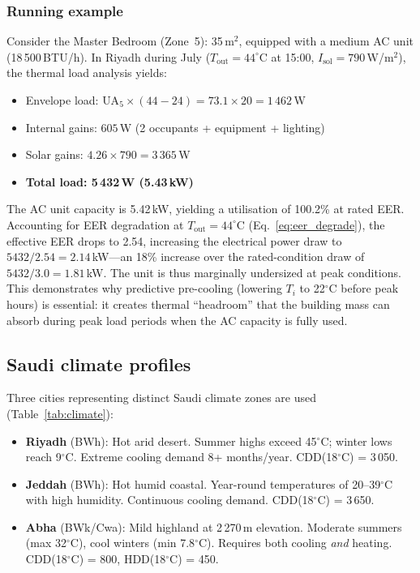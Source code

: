 \documentclass[12pt]{article}
\theoremstyle{plain}
\theoremstyle{definition}
\begin{document}
\subsubsection{Running example}
Consider the Master Bedroom (Zone~5): 35\,m$^2$, equipped with a medium AC unit (18\,500\,BTU/h). In Riyadh during July ($T_{\text{out}} = 44^\circ$C at 15:00, $I_{\text{sol}} = 790$\,W/m$^2$), the thermal load analysis yields:
\begin{itemize}[leftmargin=*]
\item Envelope load: $\text{UA}_5 \times (44 - 24) = 73.1 \times 20 = 1\,462$\,W
\item Internal gains: $605$\,W (2 occupants + equipment + lighting)
\item Solar gains: $4.26 \times 790 = 3\,365$\,W
\item \textbf{Total load: 5\,432\,W (5.43\,kW)}
\end{itemize}
The AC unit capacity is 5.42\,kW, yielding a utilisation of 100.2\% at rated EER. Accounting for EER degradation at $T_{\text{out}} = 44^\circ$C (Eq.~\ref{eq:eer_degrade}), the effective EER drops to 2.54, increasing the electrical power draw to $5432/2.54 = 2.14$\,kW---an 18\% increase over the rated-condition draw of $5432/3.0 = 1.81$\,kW. The unit is thus marginally undersized at peak conditions. This demonstrates why predictive pre-cooling (lowering $T_i$ to 22$^\circ$C before peak hours) is essential: it creates thermal ``headroom'' that the building mass can absorb during peak load periods when the AC capacity is fully used.

\subsection{Saudi climate profiles}\label{sec:climate}

Three cities representing distinct Saudi climate zones are used (Table~\ref{tab:climate}):
\begin{itemize}[leftmargin=*]
\item \textbf{Riyadh} (BWh): Hot arid desert. Summer highs exceed 45$^\circ$C; winter lows reach 9$^\circ$C. Extreme cooling demand 8+ months/year. CDD(18$^\circ$C) = 3\,050.
\item \textbf{Jeddah} (BWh): Hot humid coastal. Year-round temperatures of 20--39$^\circ$C with high humidity. Continuous cooling demand. CDD(18$^\circ$C) = 3\,650.
\item \textbf{Abha} (BWk/Cwa): Mild highland at 2\,270\,m elevation. Moderate summers (max 32$^\circ$C), cool winters (min 7.8$^\circ$C). Requires both cooling \emph{and} heating. CDD(18$^\circ$C) = 800, HDD(18$^\circ$C) = 450.
\end{itemize}
\end{document}
